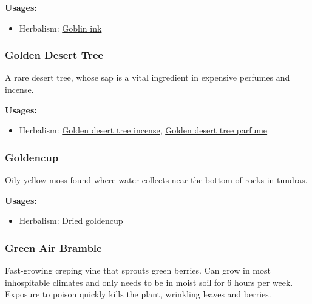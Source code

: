 \textbf{Usages:}

\begin{itemize}[noitemsep]
\item[] Herbalism: \hyperref[Goblin ink]{Goblin ink}
\end{itemize}

\subsubsection{Golden Desert Tree}
\label{Golden Desert Tree}

A rare desert tree, whose sap is a vital ingredient in expensive perfumes and incense.

\vspace{5mm}

\textbf{Usages:}

\begin{itemize}[noitemsep]
\item[] Herbalism: \hyperref[Golden desert tree incense]{Golden desert tree incense}, \hyperref[Golden desert tree parfume]{Golden desert tree parfume}
\end{itemize}

\subsubsection{Goldencup}
\label{Goldencup}

Oily yellow moss found where water collects near the bottom of rocks in tundras.

\vspace{5mm}

\textbf{Usages:}

\begin{itemize}[noitemsep]
\item[] Herbalism: \hyperref[Dried goldencup]{Dried goldencup}
\end{itemize}

\subsubsection{Green Air Bramble}
\label{Green Air Bramble}

Fast-growing creping vine that sprouts green berries. Can grow in most inhospitable climates and only needs to be in moist soil for 6 hours per week. Exposure to poison quickly kills the plant, wrinkling leaves and berries.

\vspace{5mm}


